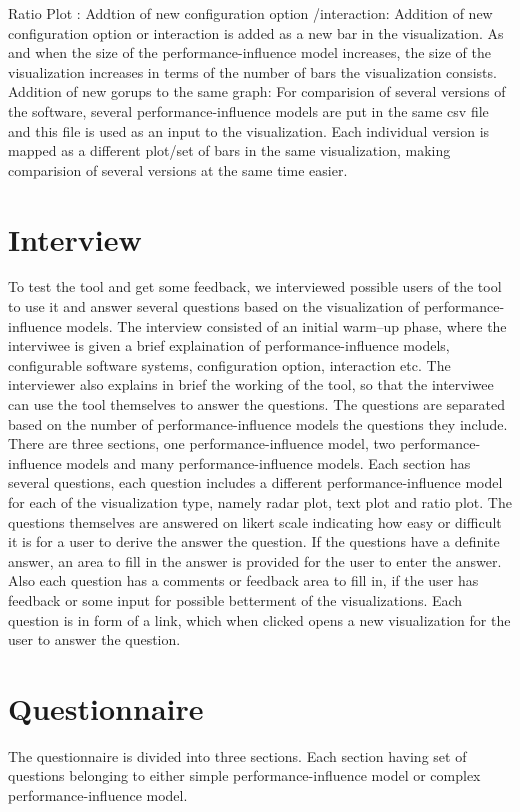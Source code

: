 Ratio Plot : 
Addtion of new configuration option /interaction: Addition of new configuration option or interaction is added as a new bar in the visualization. As and when the size of the performance-influence model increases, the size of the visualization increases in terms of the number of bars the visualization consists. 
Addition of new gorups to the same graph: For comparision of several versions of the software, several performance-influence models are put in the same csv file and this file is used as an input to the visualization. Each individual version is mapped as a different plot/set of bars in the same visualization, making comparision of several versions at the same time easier.

\section{Interview}

To test the tool and get some feedback, we interviewed possible users of the tool to use it and answer several questions based on the visualization of performance-influence models. The interview consisted of an initial warm--up phase, where the interviwee is given a brief explaination of performance-influence models, configurable software systems, configuration option, interaction etc. The interviewer also explains in brief the working of the tool, so that the interviwee can use the tool themselves to answer the questions.
The questions are separated based on the number of performance-influence models the questions they include. There are three sections, one performance-influence model, two performance-influence models and many performance-influence models. Each section has several questions, each question includes a different performance-influence model for each of the visualization type, namely radar plot, text plot and ratio plot. 
The questions themselves are answered on likert scale indicating how easy or difficult it is for a user to derive the answer the question. If the questions have a definite answer, an area to fill in the answer is provided for the user to enter the answer. Also each question has a comments or feedback area to fill in, if the user has feedback or some input for possible betterment of the visualizations.
Each question is in form of a link, which when clicked opens a new visualization for the user to answer the question.

\section{Questionnaire}
The questionnaire is divided into three sections. Each section having set of questions belonging to either simple performance-influence model or complex performance-influence model.

